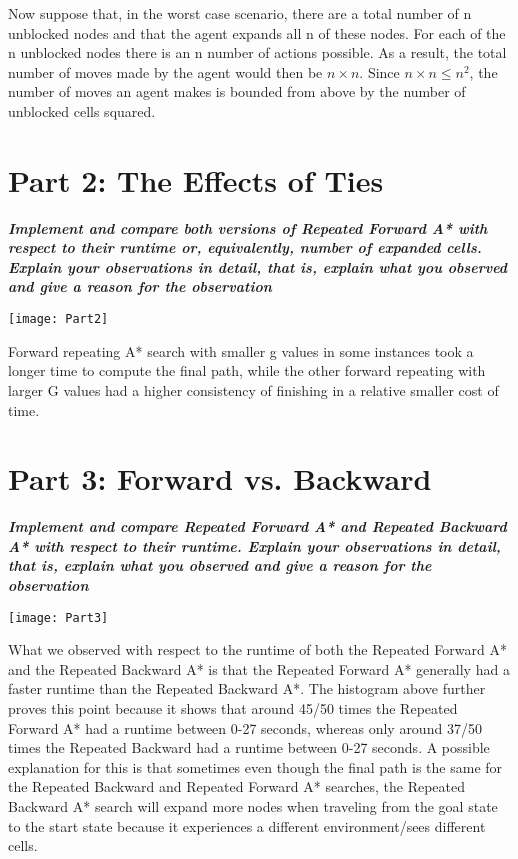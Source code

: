 \documentclass[]{report}
\begin{document}
\hangindent=0.5cm
 Now suppose that, in the worst case scenario, there are a total number of n unblocked nodes and that the agent expands all n of these nodes. For each of the n unblocked nodes there is an n number of actions possible. As a result, the total number of moves made by the agent would then be $ n \times n $. Since $n \times n \leq n^2$, the number of moves an agent makes is bounded from above by the number of unblocked cells squared.  
 

\pagebreak 
\section*{Part 2: The Effects of Ties}
\textbf{\textit{Implement and compare both versions of Repeated Forward A* with respect to their runtime or, equivalently, number of expanded cells. Explain your observations in detail, that is, explain what you observed and give a reason for the observation}}

\begin{center}
	\texttt{[image: Part2]}
\end{center}

Forward repeating A* search with smaller g values in some instances took a longer time to compute the final path, while the other forward repeating with larger G values had a higher consistency of finishing in a relative smaller cost of time. 


\pagebreak
\section*{Part 3: Forward vs. Backward}
\textbf{\textit{Implement and compare Repeated Forward A* and Repeated Backward A* with respect to their runtime. Explain your observations in detail, that is, explain what you observed and give a reason for the observation}}

\begin{center}
	\texttt{[image: Part3]}
\end{center}

\hangindent=0.5cm
What we observed with respect to the runtime of both the Repeated Forward A* and the Repeated Backward A* is that the Repeated Forward A* generally had a faster runtime than the Repeated Backward A*. The histogram above further proves this point because it shows that around 45/50 times the Repeated Forward A* had a runtime between 0-27 seconds, whereas only around 37/50 times the Repeated Backward had a runtime between 0-27 seconds. A possible explanation for this is that sometimes even though the final path is the same for the Repeated Backward and Repeated Forward A* searches, the Repeated Backward A* search will expand more nodes when traveling from the goal state to the start state because it experiences a different environment/sees different cells. 
\end{document}
